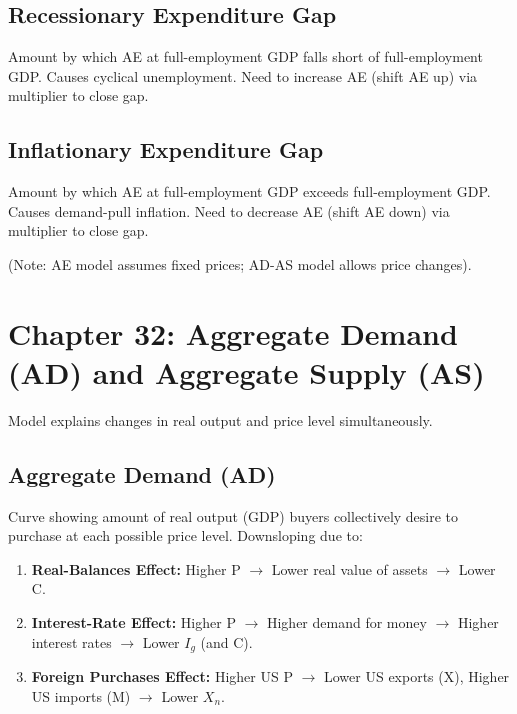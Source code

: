 \documentclass{article}
\begin{document}
\subsection*{Recessionary Expenditure Gap}
Amount by which AE at full-employment GDP falls short of full-employment GDP. Causes cyclical unemployment. Need to increase AE (shift AE up) via multiplier to close gap.

\subsection*{Inflationary Expenditure Gap}
Amount by which AE at full-employment GDP exceeds full-employment GDP. Causes demand-pull inflation. Need to decrease AE (shift AE down) via multiplier to close gap.

(Note: AE model assumes fixed prices; AD-AS model allows price changes).

\section*{Chapter 32: Aggregate Demand (AD) and Aggregate Supply (AS)}

Model explains changes in real output and price level simultaneously.

\subsection*{Aggregate Demand (AD)}
Curve showing amount of real output (GDP) buyers collectively desire to purchase at each possible price level. Downsloping due to:
\begin{enumerate}
    \item \textbf{Real-Balances Effect:} Higher P $\rightarrow$ Lower real value of assets $\rightarrow$ Lower C.
    \item \textbf{Interest-Rate Effect:} Higher P $\rightarrow$ Higher demand for money $\rightarrow$ Higher interest rates $\rightarrow$ Lower $I_g$ (and C).
    \item \textbf{Foreign Purchases Effect:} Higher US P $\rightarrow$ Lower US exports (X), Higher US imports (M) $\rightarrow$ Lower $X_n$.
\end{enumerate}
\end{document}
